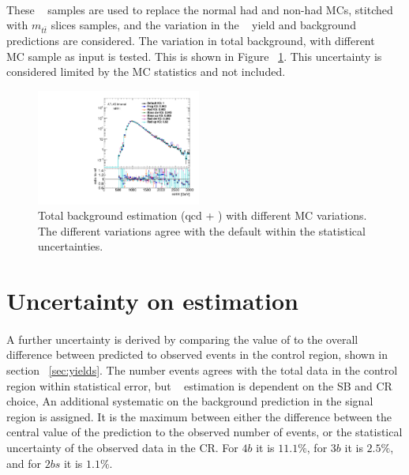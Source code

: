 \paragraph{}
These \ttbar~ samples are used to replace the normal had and non-had MCs, stitched with $m_{t\bar{t}}$ slices samples, and the variation in the \ttbar~ yield and background predictions are considered. 
The variation in total background, with different \ttbar~ MC sample as input is tested. 
This is shown in Figure ~\ref{fig:ttbar-MC}. 
This uncertainty is considered limited by the MC statistics and not included.

\begin{figure}[htbp!]
\begin{center} 
\includegraphics[width=0.48\textwidth,angle=-90]{figures/boosted/Other/directcompare_mHH_l_1_TwoTag_split_Top_syst_stat_postfit_all_.pdf}
\caption{Total background estimation (qcd + \ttbar) with different \ttbar MC variations. The different variations agree with the default within the statistical uncertainties.}
\label{fig:ttbar-MC}
\end{center}
\end{figure}



\section{Uncertainty on \muqcd estimation}
\label{sec:non-closure-mu-qcd}

\paragraph{}
A further uncertainty is derived by comparing the value of \muqcd to the overall difference between predicted to observed events in the control region, shown in section ~\ref{sec:yields}. 
The number events agrees with the total data in the control region within statistical error, but \muqcd~ estimation is dependent on the SB and CR choice,
An additional systematic on the background prediction in the signal region is assigned. 
It is the maximum between either the difference between the central value of the prediction to the observed number of events, or the statistical uncertainty of the observed data in the CR.
For $4b$ it is $11.1\%$, for $3b$ it is $2.5\%$, and for $2bs$ it is $1.1\%$. 

